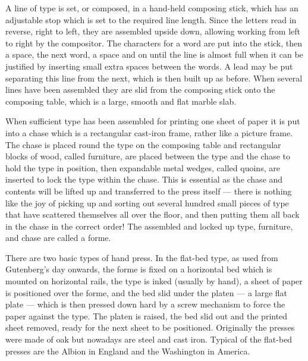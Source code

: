 \documentclass[10pt,a4paper,oneside,extrafontsizes]{memoir}%
\newcommand{\PWnote}[2]{}
\begin{document}
\begin{paracol}{2}
\switchEng
    A line of type is set, or composed, in a hand-held 
composing stick, which
has an adjustable stop which is set to the required line length. Since the
letters read in reverse, right to left, they are assembled upside down, 
allowing working from left to right by the compositor. The characters for
a word are put into the stick, then a space, the next word, a space and on
until the line is almost full when it can be justified by inserting small extra 
spaces between the words. A lead may be put separating this line from the next,
which is then built up as before. When several lines have been assembled they
are slid from the composing stick onto the composing table, which is
a large, smooth and flat marble slab.


\enlargethispage{1em}

    When sufficient type has been assembled for printing one sheet of paper
it is put into a chase which is a rectangular cast-iron frame, 
rather like a picture frame. The chase is placed round the type
on the composing table and rectangular
blocks of wood, called furniture, are placed between the type and the chase
to hold the type in position, then expandable metal wedges, called 
quoins,
are inserted to lock the type within the chase. This is essential as the
chase and contents will be lifted up and transferred to the press itself ---
there is nothing like the joy of picking up and sorting out several hundred
small pieces of type that have scattered themselves all over the floor, and 
then putting them all back in the chase in the correct order! The assembled
and locked up type, furniture, and chase are called a forme.




\PWnote{2009/03/29}{Revised description of composing type and added paras 
        about kinds of hand presses}
    There are two basic types of hand press. In the 
flat-bed type, as 
used from Gutenberg's day onwards, the forme is fixed on a horizontal bed
which is mounted on horizontal rails, the type is inked (usually by hand), 
a sheet of paper is positioned over the forme, and the bed
slid under the platen --- a large flat plate --- which is then pressed
down hard by a screw mechanism to force the paper against the type. The platen 
is raised, the bed slid out and the printed sheet removed, ready for the next
sheet to be positioned. Originally the presses were made of oak but
nowadays are steel and cast iron. Typical of
the flat-bed presses are the  Albion in England 
and the Washington in America.


\end{paracol}
\end{document}
